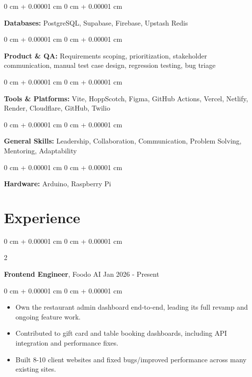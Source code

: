 \documentclass[10pt, letterpaper]{article}
\newenvironment{highlights}{
    \begin{itemize}[
        topsep=0.10 cm,
        parsep=0.10 cm,
        partopsep=0pt,
        itemsep=0pt,
        leftmargin=0 cm + 10pt
    ]
}{
    \end{itemize}
} %
\newenvironment{onecolentry}{
    \begin{adjustwidth}{
        0 cm + 0.00001 cm
    }{
        0 cm + 0.00001 cm
    }
}{
    \end{adjustwidth}
} %
\newenvironment{twocolentry}[2][]{
    \onecolentry
    \def\secondColumn{#2}
    \setcolumnwidth{\fill, 4.5 cm}
    \begin{paracol}{2}
}{
    \switchcolumn \raggedleft \secondColumn
    \end{paracol}
    \endonecolentry
} %
\begin{document}
\vspace{0.5em}

\begin{onecolentry}
    \textbf{Databases:} PostgreSQL, Supabase, Firebase, Upstash Redis
\end{onecolentry}

\vspace{0.5em}

\begin{onecolentry}
    \textbf{Product \& QA:} Requirements scoping, prioritization, stakeholder communication, manual test case design, regression testing, bug triage
\end{onecolentry}

\vspace{0.5em}

\begin{onecolentry}
    \textbf{Tools \& Platforms:} Vite, HoppScotch, Figma, GitHub Actions, Vercel, Netlify, Render, Cloudflare, GitHub, Twilio
\end{onecolentry}

\vspace{0.5em}

        \begin{onecolentry}
    \textbf{General Skills:} Leadership, Collaboration, Communication, Problem Solving, Mentoring, Adaptability
\end{onecolentry}

\vspace{0.5em}

        \begin{onecolentry}
    \textbf{Hardware:} Arduino, Raspberry Pi
\end{onecolentry}


        \section{Experience}
        \begin{twocolentry}{
            Jan 2026 - Present
        }
            \textbf{Frontend Engineer}, Foodo AI\end{twocolentry}

        \vspace{0.10 cm}
        \begin{onecolentry}
            \begin{highlights}
                \item Own the restaurant admin dashboard end-to-end, leading its full revamp and ongoing feature work.
                \item Contributed to gift card and table booking dashboards, including API integration and performance fixes.
                \item Built 8-10 client websites and fixed bugs/improved performance across many existing sites.
            \end{highlights}
        \end{onecolentry}
\end{document}
